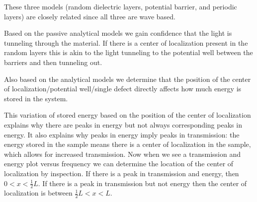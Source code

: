 \begin{comment}
\begin{figure}
\vskip -0.5cm
\centerline{
\scalebox{0.3}{\texttt{[image: pictures/passive\_defect\_14]}}
\scalebox{0.3}{\texttt{[image: pictures/passive\_defect\_12]}}
\scalebox{0.3}{\texttt{[image: pictures/passive\_defect\_34]}}}
\vskip -0.5cm
\caption{The three plots correspond to a single defect at
at $\frac{1}{4}$L, $\frac{1}{2}$L, and $\frac{3}{4}$L,
respectively, for the passive periodic system
on semilogy scale (another analytical model). We see the same
results we saw for Fig.~\ref{fig:barrierdefectlog} so
now we are confident that tunneling is causing the effect
seen in Fig.~\ref{fig:peaksmatchnotmatch}.}
\end{figure}
\end{comment}

These three models (random dielectric layers, potential barrier, and periodic layers) are closely related since all three are wave based.

Based on the passive analytical models we gain confidence that the light is tunneling through the material.  If there is a center of localization present in the random layers this is akin to the light tunneling to the potential well between the barriers and then tunneling out.

Also based on the analytical models we determine that the position of the center of localization/potential well/single defect directly affects how much energy is stored in the system.

\begin{comment}
\begin{figure}
\vskip -0.5cm
\centerline{
\scalebox{0.5}{\texttt{[image: pictures/T\_E\_on\_resonance\_vs\_xo]}}}
\vskip -0.5cm
\caption{Transmission and energy and their ratio as a function of
the position of the center of localization. The energy plot is
similar to the theoretical energy in Fig.~\ref{fig:peaksmatchnotmatch}
As a result of the asymmetry in energy with respect
to defect position, the ratio of transmission to energy is not constant.}
\end{figure}
\end{comment}

This variation of stored energy based on the position of
the center of localization explains why there are peaks
in energy but not always corresponding peaks in energy.
It also explains why peaks in energy imply peaks 
in transmission: the energy stored in the sample
means there is a center of localization in the sample, which
allows for increased transmission.  Now when we see a transmission and
energy plot versus frequency we can determine the location
of the center of localization by inspection.  If there is
a peak in transmission and energy,
then $ 0 < x < \frac{1}{2} L $.  If there is a peak
in transmission but not energy then the center of
localization is between $ \frac{1}{2} L < x < L $.

